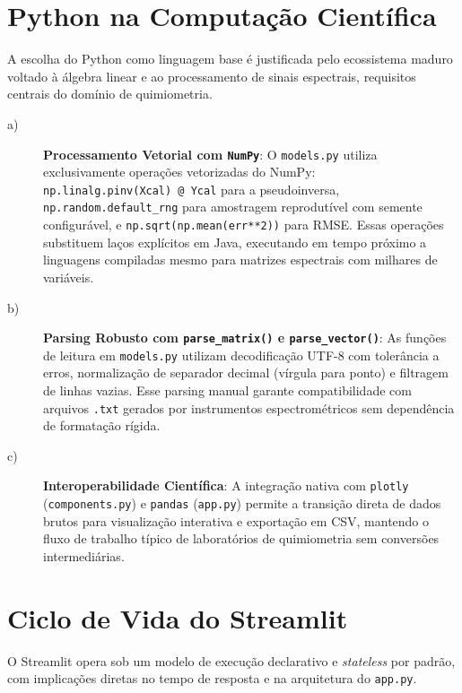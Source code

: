 \section{Python na Computação Científica}

A escolha do Python como linguagem base é justificada pelo ecossistema maduro voltado à
álgebra linear e ao processamento de sinais espectrais, requisitos centrais do domínio de
quimiometria.

\begin{description}

\item[a)] \textbf{Processamento Vetorial com \texttt{NumPy}}: O \texttt{models.py}
utiliza exclusivamente operações vetorizadas do NumPy:
\texttt{np.linalg.pinv(Xcal)~@~Ycal} para a pseudoinversa, \texttt{np.random.default\_rng}
para amostragem reprodutível com semente configurável, e \texttt{np.sqrt(np.mean(err**2))}
para RMSE. Essas operações substituem laços explícitos em Java, executando em tempo próximo
a linguagens compiladas mesmo para matrizes espectrais com milhares de variáveis.

\item[b)] \textbf{Parsing Robusto com \texttt{parse\_matrix()} e \texttt{parse\_vector()}}:
As funções de leitura em \texttt{models.py} utilizam decodificação UTF-8 com tolerância a
erros, normalização de separador decimal (vírgula para ponto) e filtragem de linhas
vazias. Esse parsing manual garante compatibilidade com arquivos \texttt{.txt} gerados
por instrumentos espectrométricos sem dependência de formatação rígida.

\item[c)] \textbf{Interoperabilidade Científica}: A integração nativa com \texttt{plotly}
(\texttt{components.py}) e \texttt{pandas} (\texttt{app.py}) permite a transição direta
de dados brutos para visualização interativa e exportação em CSV, mantendo o fluxo de
trabalho típico de laboratórios de quimiometria sem conversões intermediárias.

\end{description}

\section{Ciclo de Vida do Streamlit}

O Streamlit opera sob um modelo de execução declarativo e \textit{stateless} por padrão,
com implicações diretas no tempo de resposta e na arquitetura do \texttt{app.py}.

